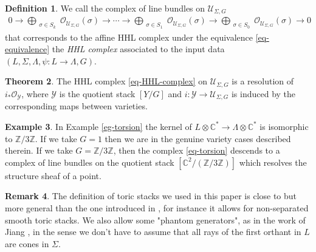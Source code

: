 \documentclass[11pt,reqno]{amsart}
\def\C {{\mathbb C}}
\def\Z {{\mathbb Z}}
\theoremstyle{definition}
\newtheorem{theorem}{Theorem}[section]
\newtheorem{definition}[theorem]{Definition}
\newtheorem{example}[theorem]{Example}
\newtheorem{remark}[theorem]{Remark}
\numberwithin{equation}{section}
\begin{document}
\begin{definition}
    We call the complex of line bundles on $\mathcal{U}_{\Sigma,G}$ 
    \begin{align}\label{eq-HHL-complex}
        0\rightarrow\bigoplus_{\substack{\sigma\in S_{k} }} \mathcal{O}_{\mathcal{U}_{\Sigma,G}}(\sigma) \rightarrow \cdots \rightarrow \bigoplus_{\substack{\sigma\in S_{1}}} \mathcal{O}_{\mathcal{U}_{\Sigma,G}}(\sigma) \rightarrow \bigoplus_{\substack{\sigma\in S_{0}}} \mathcal{O}_{\mathcal{U}_{\Sigma,G}}(\sigma)\rightarrow0
    \end{align}
    that corresponds to the affine HHL complex under the equivalence \eqref{eq-equivalence} the \textit{HHL complex} associated to the input data $(L,\Sigma,\Lambda,\psi: L\rightarrow \Lambda, G)$.
\end{definition}


\smallskip

\begin{theorem}\label{thm-3}
    The HHL complex \eqref{eq-HHL-complex} on $\mathcal{U}_{\Sigma,G}$ is a resolution of $i_*\mathcal{O}_{\mathcal{Y}}$, where $\mathcal{Y}$ is the quotient stack $[Y/G]$ and $i:\mathcal{Y}\rightarrow \mathcal{U }_{\Sigma,G}$ is induced by the corresponding maps between varieties.
\end{theorem}


\begin{example}
    In Example \ref{eg-torsion} the kernel of $L\otimes\C^*\rightarrow \Lambda\otimes\C^*$ is isomorphic to $\Z/3\Z$. If we take $G = 1$ then we are in the genuine variety cases described therein. If we take $G=\Z/3\Z$, then the complex \eqref{eq-torsion} descends to a complex of line bundles on the quotient stack $[\C^2/(\Z/3\Z)]$ which resolves the structure sheaf of a point.
\end{example}


\begin{remark}
The definition of toric stacks we used in this paper is close to but more general than the one introduced in \cite{BCS},
for instance it allows for non-separated smooth toric stacks. We also allow some "phantom generators", as in the work of Jiang  \cite{Jiang}, in the sense we don't have to assume that all rays of the first orthant in $L$ are cones in $\Sigma$.
\end{remark}

\smallskip
\end{document}
